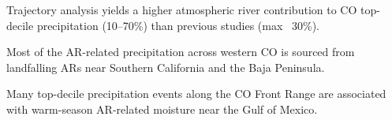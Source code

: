 \documentclass[draft]{agujournal2019}
\begin{document}






\begin{keypoints}
\item Trajectory analysis yields a higher atmospheric river contribution to CO top-decile precipitation (10–70\%) than previous studies (max ~30\%).
\item Most of the AR-related precipitation across western CO is sourced from landfalling ARs near Southern California and the Baja Peninsula.
\item Many top-decile precipitation events along the CO Front Range are associated with warm-season AR-related moisture near the Gulf of Mexico.
\end{keypoints}

%
%

%
%
\end{document}

